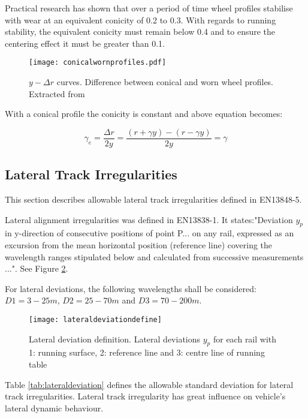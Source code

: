 Practical research has shown that over a period of time wheel profiles stabilise with wear at an equivalent conicity of 0.2 to 0.3. With regards to running stability, the equivalent conicity must remain below 0.4 and to ensure the centering effect it must be greater than 0.1.

\begin{figure}[h]
    \centering
    \texttt{[image: conicalwornprofiles.pdf]}
    \caption{$y-\Delta r$ curves. Difference between conical and worn wheel profiles. Extracted from \cite[2.4]{esveld2001modern}}
    \label{fig:conicalwornprofiles}
\end{figure}

With a conical profile the conicity is constant and above equation becomes:

$$ \gamma_e = \frac{\Delta r}{2y} =\frac{(r+\gamma y)-(r-\gamma y)}{2y} = \gamma $$

\subsection{Lateral Track Irregularities}\label{sec:lateraltrackirrgularities}
This section describes allowable lateral track irregularities defined in EN13848-5\cite{13848}. 

Lateral alignment irregularities was defined in EN13838-1. It states:"Deviation $y_p$ in y-direction of consecutive positions of point P... on any rail, expressed as an excursion from the mean horizontal position (reference line) covering the wavelength ranges stipulated below and calculated from successive measurements ...". See Figure \ref{fig:lateraldeviationdefine}.

For lateral deviations, the following wavelengths shall be considered: $D1 = 3 -25 m$, $D2 = 25 - 70 m$ and $D3 = 70 - 200 m$. 

\begin{figure}[h]
    \centering
    \texttt{[image: lateraldeviationdefine]}
    \caption{Lateral deviation definition. Lateral deviations $y_p$ for each rail with 1: running surface, 2: reference line and 3: centre line of running table}
    \label{fig:lateraldeviationdefine}
\end{figure}

Table \ref{tab:lateraldeviation} defines the allowable standard deviation for lateral track irregularities. Lateral track irregularity has great influence on vehicle's lateral dynamic behaviour.

